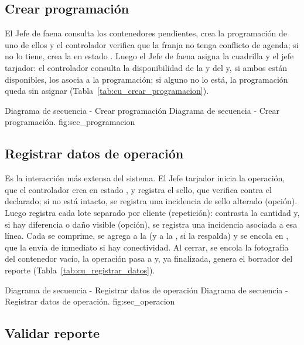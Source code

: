 \subsection{Crear programación}
\label{subsec:sec_programacion}

El Jefe de faena consulta los contenedores pendientes, crea la programación de uno de ellos y el
controlador
 verifica que la franja no tenga conflicto de agenda; si no lo tiene,
crea la  en estado . Luego el Jefe de faena asigna la
cuadrilla y el jefe tarjador: el controlador consulta la disponibilidad de la  y
del  y, si ambos están disponibles, los asocia a la programación; si alguno no
lo está, la programación queda sin asignar (Tabla~\ref{tab:cu_crear_programacion}).

{Diagrama de secuencia - Crear programación}
{Diagrama de secuencia - Crear programación.}
{fig:sec_programacion}

\subsection{Registrar datos de operación}
\label{subsec:sec_operacion}

Es la interacción más extensa del sistema. El Jefe tarjador inicia la operación, que el
controlador  crea en estado , y registra el sello, que
 verifica contra el declarado; si no está intacto, se registra una incidencia
de sello alterado (opción). Luego registra cada lote separado por cliente (repetición):
 contrasta la cantidad y, si hay diferencia o daño visible (opción), se registra
una incidencia asociada a esa línea. Cada  se comprime, se agrega a la
 (y a la , si la respalda) y se encola en
, que la envía de inmediato si hay conectividad. Al cerrar, se encola la
fotografía del contenedor vacío, la operación pasa a  y, ya finalizada,
 genera el borrador del reporte (Tabla~\ref{tab:cu_registrar_datos}).

{Diagrama de secuencia - Registrar datos de operación}
{Diagrama de secuencia - Registrar datos de operación.}
{fig:sec_operacion}

\subsection{Validar reporte}
\label{subsec:sec_reporte}

